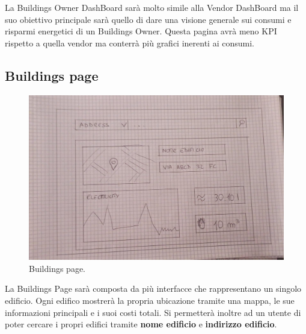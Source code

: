 \documentclass{report}
\begin{document}
La Buildings Owner DashBoard sarà molto simile alla Vendor DashBoard ma il suo obiettivo principale sarà quello di dare una visione generale sui consumi e risparmi energetici di un Buildings Owner.
Questa pagina avrà meno KPI rispetto a quella vendor ma conterrà più grafici inerenti ai consumi. 
\FloatBarrier


\subsection{Buildings page}
\begin{figure}[H]
  \includegraphics[width=\linewidth]{Buildings.jpeg}
  \caption{Buildings page.}
  \label{fig:Buildings page}
\end{figure}
La Buildings Page sarà composta da più interfacce che rappresentano un singolo edificio. Ogni edifico mostrerà la propria ubicazione tramite una mappa, le sue informazioni principali e i suoi costi totali. 
Si permetterà inoltre ad un utente di poter cercare i propri edifici tramite \textbf{nome edificio} e \textbf{indirizzo edificio}.
\FloatBarrier
\end{document}
